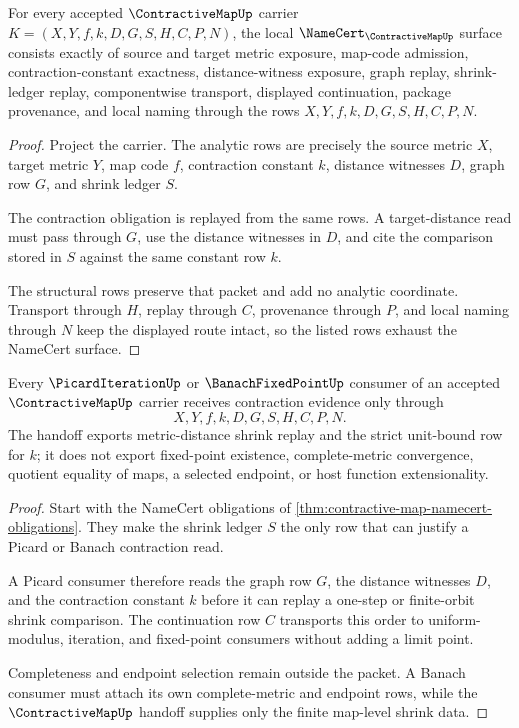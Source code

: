 \begin{theorem}
\label{thm:contractive-map-namecert-obligations}
For every accepted $\ContractiveMapUp$ carrier $K=(X,Y,f,k,D,G,S,H,C,P,N)$, the local $\NameCert_{\ContractiveMapUp}$ surface consists exactly of source and target metric exposure, map-code admission, contraction-constant exactness, distance-witness exposure, graph replay, shrink-ledger replay, componentwise transport, displayed continuation, package provenance, and local naming through the rows $X,Y,f,k,D,G,S,H,C,P,N$.
\end{theorem}
\begin{proof}
Project the carrier. The analytic rows are precisely the source metric $X$, target metric $Y$, map code $f$, contraction constant $k$, distance witnesses $D$, graph row $G$, and shrink ledger $S$.

The contraction obligation is replayed from the same rows. A target-distance read must pass through $G$, use the distance witnesses in $D$, and cite the comparison stored in $S$ against the same constant row $k$.

The structural rows preserve that packet and add no analytic coordinate. Transport through $H$, replay through $C$, provenance through $P$, and local naming through $N$ keep the displayed route intact, so the listed rows exhaust the NameCert surface.
\end{proof}

\begin{theorem}
\label{thm:contractive-map-picard-consumer-handoff}
Every $\PicardIterationUp$ or $\BanachFixedPointUp$ consumer of an accepted $\ContractiveMapUp$ carrier receives contraction evidence only through
$$
X,Y,f,k,D,G,S,H,C,P,N.
$$
The handoff exports metric-distance shrink replay and the strict unit-bound row for $k$; it does not export fixed-point existence, complete-metric convergence, quotient equality of maps, a selected endpoint, or host function extensionality.
\end{theorem}
\begin{proof}
Start with the NameCert obligations of \autoref{thm:contractive-map-namecert-obligations}. They make the shrink ledger $S$ the only row that can justify a Picard or Banach contraction read.

A Picard consumer therefore reads the graph row $G$, the distance witnesses $D$, and the contraction constant $k$ before it can replay a one-step or finite-orbit shrink comparison. The continuation row $C$ transports this order to uniform-modulus, iteration, and fixed-point consumers without adding a limit point.

Completeness and endpoint selection remain outside the packet. A Banach consumer must attach its own complete-metric and endpoint rows, while the $\ContractiveMapUp$ handoff supplies only the finite map-level shrink data.
\end{proof}

